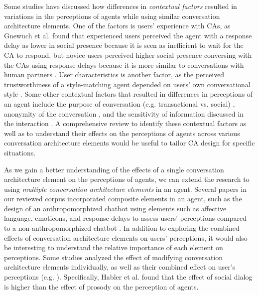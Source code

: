 Some studies have discussed how differences in \textit{contextual factors} resulted in variations in the perceptions of agents while using similar conversation architecture elements. One of the factors is users' experience with CAs, as Gnewuch et al. \cite{gnewuch2018faster}\cmt{[19]} found that experienced users perceived the agent with a response delay as lower in social presence because it is seen as inefficient to wait for the CA to respond, but novice users perceived higher social presence conversing with the CAs using response delays because it is more similar to conversations with human partners \cite{gnewuch2018faster}\cmt{[19]}. User characteristics is another factor, as the perceived trustworthiness of a style-matching agent depended on users' own conversational style \cite{hoegen2019end}\cmt{[31]}. Some other contextual factors that resulted in differences in perceptions of an agent include the purpose of conversation (e.g. transactional vs. social) \cite{jeong2019exploring}\cmt{[10]}, anonymity of the conversation \cite{lee2020hear}\cmt{[23]}, and the sensitivity of information discussed in the interaction \cite{cox2022does}\cmt{[27]}. A comprehensive review to identify these contextual factors as well as to understand their effects on the perceptions of agents across various conversation architecture elements would be useful to tailor CA design for specific situations. 

As we gain a better understanding of the effects of a single conversation architecture element on the perceptions of agents, we can extend the research to using \textit{multiple conversation architecture elements} in an agent. Several papers in our reviewed corpus incorporated composite elements in an agent, such as the design of an anthropomorphized chatbot using elements such as affective language, emoticons, and response delays to assess users' perceptions compared to a non-anthropomorphized chatbot \cite{seeger2021chatbots}\cmt{[35]}. In addition to exploring the combined effects of conversation architecture elements on users' perceptions, it would also be interesting to understand the relative importance of each element on perceptions. Some studies analyzed the effect of modifying conversation architecture elements individually, as well as their combined effect on user's perceptions (e.g. \cite{habler2019effects, lubold2016effects, zhu2022effects}\cmt{[63][86][26]}). Specifically, Habler et al. \cite{habler2019effects}\cmt{[63]} found that the effect of social dialog is higher than the effect of prosody on the perception of agents. 


